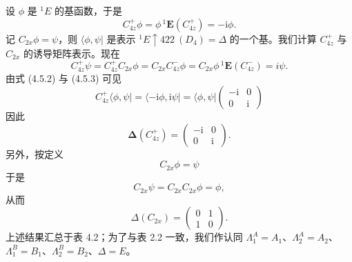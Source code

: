 设 $\phi$ 是 ${}^{1}E$ 的基函数，于是
\begin{equation*}
C^{+}_{4z}\phi = \phi\,{}^{1}\mathbf{E}(C^{+}_{4z}) = -\mathrm{i}\phi.
\tag{4.5.2}
\end{equation*}
记 $C_{2x}\phi = \psi$，则 $\langle \phi, \psi |$ 是表示 ${}^{1}E \uparrow 422\ (D_{4}) = \Delta$ 的一个基。我们计算 $C^{+}_{4z}$ 与 $C_{2x}$ 的诱导矩阵表示。现在
\begin{equation*}
C^{+}_{4z}\psi = C^{+}_{4z}C_{2x}\phi = C_{2x}C^{-}_{4z}\phi = C_{2x}\phi\,{}^{1}\mathbf{E}(C^{-}_{4z}) = i\psi.
\tag{4.5.3}
\end{equation*}
由式 (4.5.2) 与 (4.5.3) 可见
\begin{equation*}
C^{+}_{4z}\langle \phi, \psi | = \langle -\mathrm{i}\phi, \mathrm{i}\psi | = \langle \phi, \psi |\begin{pmatrix} -\mathrm{i} & 0\\ 0 & \mathrm{i} \end{pmatrix}
\end{equation*}
因此
\begin{equation*}
\boldsymbol{\Delta}(C^{+}_{4z}) = \begin{pmatrix} -\mathrm{i} & 0\\ 0 & \mathrm{i} \end{pmatrix}.
\tag{4.5.4}
\end{equation*}
另外，按定义
\begin{equation*}
C_{2x}\phi = \psi
\tag{4.5.5}
\end{equation*}
于是
\begin{equation*}
C_{2x}\psi = C_{2x}C_{2x}\phi = \phi,
\tag{4.5.6}
\end{equation*}
从而
\begin{equation*}
\Delta(C_{2x}) = \begin{pmatrix} 0 & 1\\ 1 & 0 \end{pmatrix}.
\tag{4.5.7}
\end{equation*}
上述结果汇总于表 4.2；为了与表 2.2 一致，我们作认同 $\Lambda^{A}_{1} = A_{1}$、$\Lambda^{A}_{2} = A_{2}$、$\Lambda^{B}_{1} = B_{1}$、$\Lambda^{B}_{2} = B_{2}$、$\Delta = E$。

